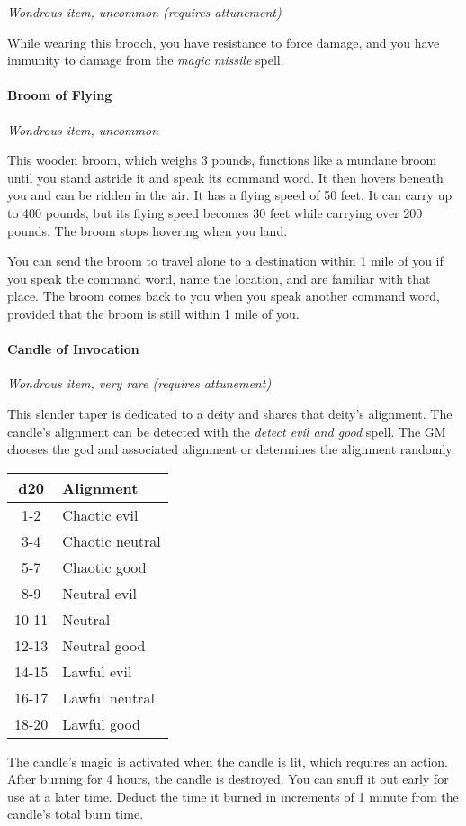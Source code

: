\documentclass[
]{article}
\begin{document}
\emph{Wondrous item, uncommon (requires attunement)}

While wearing this brooch, you have resistance to force damage, and you
have immunity to damage from the \emph{magic missile} spell.

\hypertarget{broom-of-flying}{%
\paragraph{Broom of Flying}\label{broom-of-flying}}

\emph{Wondrous item, uncommon}

This wooden broom, which weighs 3 pounds, functions like a mundane broom
until you stand astride it and speak its command word. It then hovers
beneath you and can be ridden in the air. It has a flying speed of 50
feet. It can carry up to 400 pounds, but its flying speed becomes 30
feet while carrying over 200 pounds. The broom stops hovering when you
land.

You can send the broom to travel alone to a destination within 1 mile of
you if you speak the command word, name the location, and are familiar
with that place. The broom comes back to you when you speak another
command word, provided that the broom is still within 1 mile of you.

\hypertarget{candle-of-invocation}{%
\paragraph{Candle of Invocation}\label{candle-of-invocation}}

\emph{Wondrous item, very rare (requires attunement)}

This slender taper is dedicated to a deity and shares that deity's
alignment. The candle's alignment can be detected with the \emph{detect
evil and good} spell. The GM chooses the god and associated alignment or
determines the alignment randomly.

\begin{longtable}[]{@{}cl@{}}
\toprule
d20 & Alignment\tabularnewline
\midrule
\endhead
1-2 & Chaotic evil\tabularnewline
3-4 & Chaotic neutral\tabularnewline
5-7 & Chaotic good\tabularnewline
8-9 & Neutral evil\tabularnewline
10-11 & Neutral\tabularnewline
12-13 & Neutral good\tabularnewline
14-15 & Lawful evil\tabularnewline
16-17 & Lawful neutral\tabularnewline
18-20 & Lawful good\tabularnewline
\bottomrule
\end{longtable}

The candle's magic is activated when the candle is lit, which requires
an action. After burning for 4 hours, the candle is destroyed. You can
snuff it out early for use at a later time. Deduct the time it burned in
increments of 1 minute from the candle's total burn time.
\end{document}
